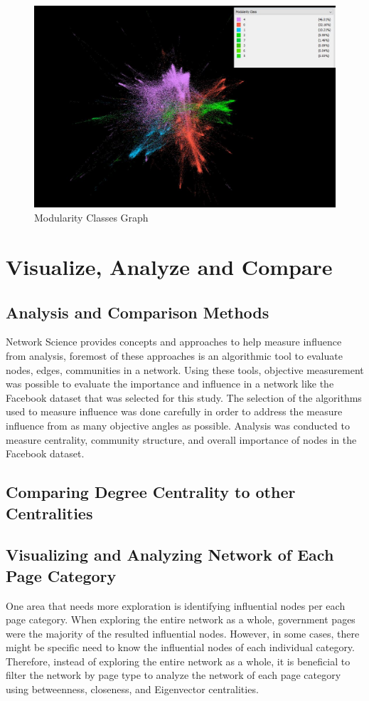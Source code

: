 \documentclass[11pt,twocolumn]{article}
\begin{document}
\begin{figure}[hbt!]
\includegraphics[scale=0.3]{modularity_community.JPG} 
\caption{Modularity Classes Graph}
\end{figure}



\section{Visualize, Analyze and Compare}

\subsection{Analysis and Comparison Methods}
Network Science provides concepts and approaches to help measure influence from analysis, foremost of these approaches is an algorithmic tool to evaluate nodes, edges, communities in a network. Using these tools, objective measurement was possible to evaluate the importance and influence in a network like the Facebook dataset that was selected for this study. The selection of the algorithms used to measure influence was done carefully in order to address the measure influence from as many objective angles as possible. Analysis was conducted to measure centrality, community structure, and overall importance of nodes in the Facebook dataset.


\subsection{Comparing Degree Centrality to other Centralities}

\subsection{Visualizing and Analyzing Network of Each Page Category}
One area that needs more exploration is identifying influential nodes per each page category. When exploring the entire network as a whole, government pages were the majority of the resulted influential nodes. However, in some cases, there might be specific need to know the influential nodes of each individual category. Therefore, instead of exploring the entire network as a whole, it is beneficial to filter the network by page type to analyze the network of each page category using betweenness, closeness, and Eigenvector centralities. 
\end{document}
